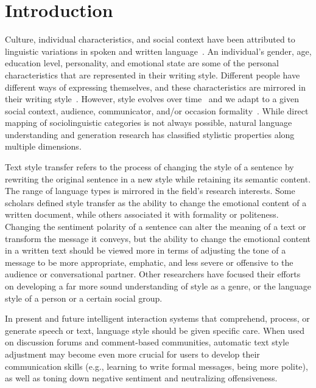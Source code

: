 \documentclass[akbc,twoside,11pt]{article}
\newcommand{\ignore}[1]{}
\begin{document}
\section{Introduction}
Culture, individual characteristics, and social context have been attributed to linguistic variations in spoken and written language~\cite{eckert2001style, coupland2007style}. \ignore{In variationist sociolinguistics, the underlying factors contributing to linguistic variations in spoken language have been extensively examined. }An individual's gender, age, education level, personality, and emotional state are some of the personal characteristics that are represented in their writing style. Different people have different ways of expressing themselves, and these characteristics are mirrored in their writing style~\cite{labov1972sociolinguistic}. However, style evolves over time~\cite{eckert2001style} and we adapt to a given social context, audience, communicator, and/or occasion formality~\cite{kiesling1998language}. While direct mapping of sociolinguistic categories is not always possible, natural language understanding and generation research has classified stylistic properties along multiple dimensions.

Text style transfer refers to the process of changing the style of a sentence by rewriting the original sentence in a new style while retaining its semantic content. The range of language types is mirrored in the field's research interests. Some scholars defined style transfer as the ability to change the emotional content of a written document, while others associated it with formality or politeness. Changing the sentiment polarity of a sentence can alter the meaning of a text or transform the message it conveys, but the ability to change the emotional content in a written text should be viewed more in terms of adjusting the tone of a message to be more appropriate, emphatic, and less severe or offensive to the audience or conversational partner. Other researchers have focused their efforts on developing a far more sound understanding of style as a genre, or the language style of a person or a certain social group. 

In present and future intelligent interaction systems that comprehend, process, or generate speech or text, language style should be given specific care. When used on discussion forums and comment-based communities, automatic text style adjustment may become even more crucial for users to develop their communication skills (e.g., learning to write formal messages, being more polite), as well as toning down negative sentiment and neutralizing offensiveness.
\end{document}
